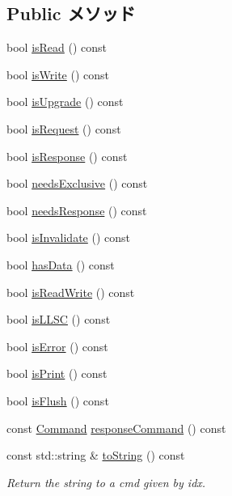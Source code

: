 \subsection*{Public メソッド}
\begin{DoxyCompactItemize}
\item 
bool \hyperlink{classMemCmd_adc47901747fc3c447db3abddaf01491a}{isRead} () const 
\item 
bool \hyperlink{classMemCmd_ab699d2f0d186312531fd1c279fd27b73}{isWrite} () const 
\item 
bool \hyperlink{classMemCmd_aadb2fde0aba4a65b45d591e9ef5b6a63}{isUpgrade} () const 
\item 
bool \hyperlink{classMemCmd_af21986d725d75fa8e1b6c83457cd4501}{isRequest} () const 
\item 
bool \hyperlink{classMemCmd_a5f89a108755a6cb3e8185d85c850a816}{isResponse} () const 
\item 
bool \hyperlink{classMemCmd_aa8e449288b878ff3ff7f286eb4d28b6a}{needsExclusive} () const 
\item 
bool \hyperlink{classMemCmd_a390c6cced05593f0a2c75a38a7a24fa9}{needsResponse} () const 
\item 
bool \hyperlink{classMemCmd_a4a1a39b8ffab2d6266cd9d794ca332e3}{isInvalidate} () const 
\item 
bool \hyperlink{classMemCmd_a0effbd4cf91891700ac41e86defe4aa6}{hasData} () const 
\item 
bool \hyperlink{classMemCmd_aa05746eae63aee1fb4758c13d0301a9f}{isReadWrite} () const 
\item 
bool \hyperlink{classMemCmd_a8965874e960faf91ad4b6af8dbf31875}{isLLSC} () const 
\item 
bool \hyperlink{classMemCmd_a32759931a1b2d6380407c6a18abd46e3}{isError} () const 
\item 
bool \hyperlink{classMemCmd_ae56bb417ddf53e85cb389267590fe969}{isPrint} () const 
\item 
bool \hyperlink{classMemCmd_a5e6baaa42eabbb07af2d1769e3c0499b}{isFlush} () const 
\item 
const \hyperlink{classMemCmd_a2afce0a47a93eee73a314d53e4890153}{Command} \hyperlink{classMemCmd_af4ef28145838bba6a01783aa0c919399}{responseCommand} () const 
\item 
const std::string \& \hyperlink{classMemCmd_a3657c48eb6bb5ad66e3fc4b08c2f87df}{toString} () const 
\begin{DoxyCompactList}\small\item\em Return the string to a cmd given by idx. \item\end{DoxyCompactList}\item 

\end{DoxyCompactItemize}
